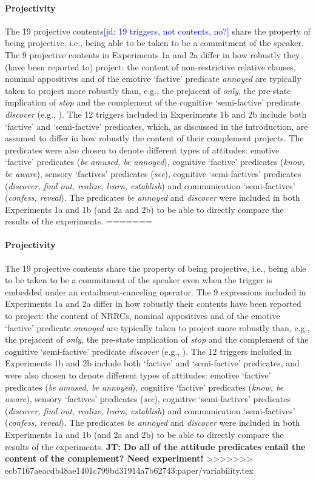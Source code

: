 \documentclass[11pt,fleqn]{article}
\newcommand{\6}{\mbox{$[\hspace*{-.6mm}[$}}
\newcommand{\9}{\mbox{$]\hspace*{-.6mm}]$}}
\newcommand{\jd}[1]{\textcolor{Blue}{[jd: #1]}}
\newcommand{\jt}[1]{\textbf{\color{blue}JT: #1}}
\begin{document}
\paragraph{Projectivity} The 19 projective contents\jd{19 triggers, not contents, no?} share the property of being projective, i.e., being able to be taken to be a commitment of the speaker. The 9 projective contents in Experiments 1a and 2a differ in how robustly they (have been reported to) project: the content of non-restrictive relative clauses, nominal appositives and of the emotive `factive' predicate {\em annoyed} are typically taken to project more robustly than, e.g., the prejacent of {\em only}, the pre-state implication of {\em stop} and the complement of the cognitive `semi-factive' predicate {\em discover} (e.g., \citealt{karttunen71b,simons01,potts05,abusch10,beaver-belly}). The 12 triggers included in Experiments 1b and 2b include both `factive' and `semi-factive' predicates, which, as discussed in the introduction, are assumed to differ in how robustly the content of their complement projects. The predicates were also chosen to denote different types of attitudes: emotive `factive' predicates ({\em be amused, be annoyed}), cognitive `factive' predicates ({\em know, be aware}), sensory `factives' predicates ({\em see}), cognitive `semi-factives' predicates ({\em discover, find out, realize, learn, establish}) and communication `semi-factives' ({\em confess, reveal}). The predicates {\em be annoyed} and {\em discover} were included in both Experiments 1a and 1b (and 2a and 2b) to be able to directly compare the results of the experiments.
=======
\paragraph{Projectivity} The 19 projective contents share the property of being projective, i.e., being able to be taken to be a commitment of the speaker even when the trigger is embedded under an entailment-canceling operator. The 9 expressions included in Experiments 1a and 2a differ in how robustly their contents have been reported to project: 
the content of NRRCs, nominal appositives and of the emotive `factive' predicate {\em annoyed} are typically taken to project more robustly than, e.g., the prejacent of {\em only}, the pre-state implication of {\em stop} and the complement of the cognitive `semi-factive' predicate {\em discover} (e.g., \citealt{karttunen71b,simons01,potts05,abusch10,beaver-belly}). The 12 triggers included in Experiments 1b and 2b include both `factive' and `semi-factive' predicates, and were also chosen to denote different types of attitudes: emotive `factive' predicates ({\em be amused, be annoyed}), cognitive `factive' predicates ({\em know, be aware}), sensory `factives' predicates ({\em see}), cognitive `semi-factives' predicates ({\em discover, find out, realize, learn, establish}) and communication `semi-factives' ({\em confess, reveal}). The predicates {\em be annoyed} and {\em discover} were included in both Experiments 1a and 1b (and 2a and 2b) to be able to directly compare the results of the experiments. \jt{Do all of the attitude predicates entail the content of the complement? Need  experiment!}
>>>>>>> ecb7167aeacdb48ae1401c799bd31914a7b62743:paper/variability.tex
\end{document}
